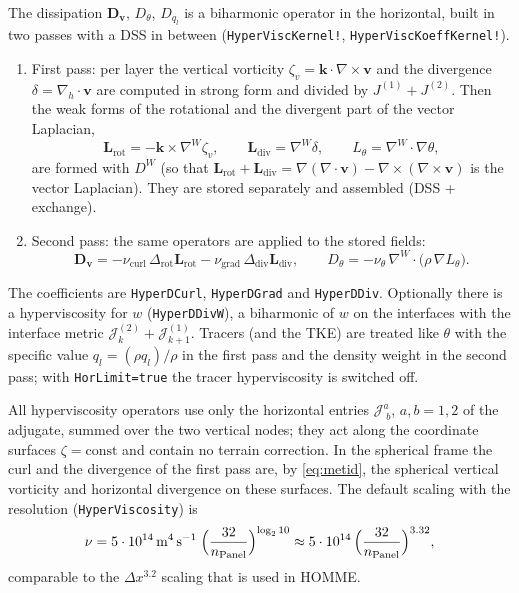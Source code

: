 \documentclass[11pt,a4paper]{article}
\newcommand{\vv}{\bm{v}}
\newcommand{\Jm}{\mathcal{J}}
\newcommand{\code}[1]{\texttt{#1}}
\begin{document}
The dissipation $\bm D_{\vv}$, $D_\theta$, $D_{q_l}$ is a biharmonic operator
in the horizontal, built in two passes with a DSS in between
(\code{HyperViscKernel!}, \code{HyperViscKoeffKernel!}).
\begin{enumerate}
\item First pass: per layer the vertical vorticity
  $\zeta_v = \bm k\cdot\nabla\times\vv$ and the divergence
  $\delta = \nabla_h\cdot\vv$ are computed in strong form and divided by
  $J^{(1)}+J^{(2)}$. Then the weak forms of the rotational and the divergent
  part of the vector Laplacian,
  \begin{equation}
    \bm L_{\text{rot}} = -\bm k\times\nabla^W \zeta_v,\qquad
    \bm L_{\text{div}} = \nabla^W\delta,\qquad
    L_\theta = \nabla^W\cdot\nabla\theta,
  \end{equation}
  are formed with $D^W$ (so that $\bm L_{\text{rot}}+\bm L_{\text{div}}
  = \nabla(\nabla\cdot\vv) - \nabla\times(\nabla\times\vv)$ is the vector
  Laplacian). They are stored separately and assembled (DSS + exchange).
\item Second pass: the same operators are applied to the stored fields:
  \begin{equation}
    \bm D_{\vv} = -\nu_{\text{curl}}\,\Delta_{\text{rot}}\bm L_{\text{rot}}
       - \nu_{\text{grad}}\,\Delta_{\text{div}}\bm L_{\text{div}},\qquad
    D_\theta = -\nu_{\theta}\,\nabla^W\cdot\bigl(\rho\,\nabla L_\theta\bigr).
  \end{equation}
\end{enumerate}
The coefficients are \code{HyperDCurl}, \code{HyperDGrad} and
\code{HyperDDiv}. Optionally there is a hyperviscosity for $w$
(\code{HyperDDivW}), a biharmonic of $w$ on the interfaces with the
interface metric $\Jm^{(2)}_k + \Jm^{(1)}_{k+1}$. Tracers (and the TKE) are
treated like $\theta$ with the specific value $q_l = (\rho q_l)/\rho$ in the
first pass and the density weight in the second pass; with
\code{HorLimit=true} the tracer hyperviscosity is switched off.

All hyperviscosity operators use only the horizontal entries
$\Jm^a_{\;b}$, $a,b = 1,2$ of the adjugate, summed over the two vertical
nodes; they act along the coordinate surfaces $\zeta = \text{const}$ and
contain no terrain correction. In the spherical frame the curl and the
divergence of the first pass are, by \eqref{eq:metid}, the spherical
vertical vorticity and horizontal divergence on these surfaces. The default scaling
with the resolution (\code{HyperViscosity}) is
\begin{equation}
  \nu = 5\cdot 10^{14}\,\mathrm{m^4\,s^{-1}}\;
  \Bigl(\frac{32}{n_{\text{Panel}}}\Bigr)^{\log_2 10}
  \approx 5\cdot 10^{14}\,\Bigl(\frac{32}{n_{\text{Panel}}}\Bigr)^{3.32},
\end{equation}
comparable to the $\Delta x^{3.2}$ scaling that is used in HOMME.
\end{document}
